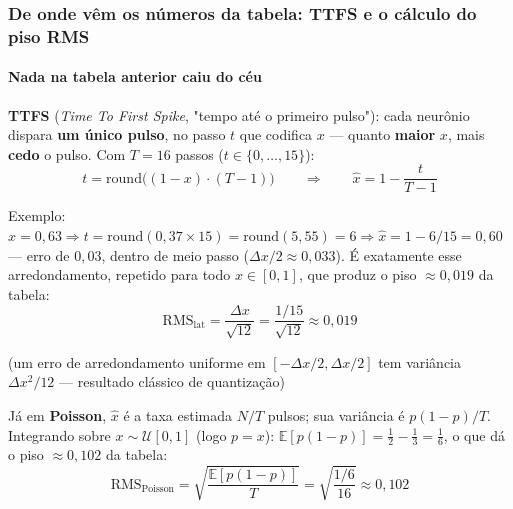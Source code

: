 \begin{frame}[shrink]
	\frametitle{De onde vêm os números da tabela: TTFS e o cálculo do piso RMS}
	\framesubtitle{Nada na tabela anterior caiu do céu}
	\small
	\par \textbf{TTFS} (\textit{Time To First Spike}, "tempo até o primeiro pulso"): cada neurônio dispara \textbf{um único pulso}, no passo $t$ que codifica $x$ --- quanto \textbf{maior} $x$, mais \textbf{cedo} o pulso. Com $T=16$ passos ($t \in \{0,\dots,15\}$):
	\begin{equation*}
		t = \mathrm{round}\big((1-x)\cdot(T-1)\big)
		\qquad\Longrightarrow\qquad
		\hat x = 1 - \frac{t}{T-1}
	\end{equation*}
	\par Exemplo: $x = 0{,}63 \Rightarrow t = \mathrm{round}(0{,}37 \times 15) = \mathrm{round}(5{,}55) = 6 \Rightarrow \hat x = 1 - 6/15 = 0{,}60$ --- erro de $0{,}03$, dentro de meio passo ($\Delta x/2 \approx 0{,}033$). É exatamente esse arredondamento, repetido para todo $x \in [0,1]$, que produz o piso $\approx 0{,}019$ da tabela:
	\begin{equation*}
		\mathrm{RMS}_{\mathrm{lat}} = \frac{\Delta x}{\sqrt{12}}
		= \frac{1/15}{\sqrt{12}} \approx 0{,}019
	\end{equation*}
	\par {\small (um erro de arredondamento uniforme em $[-\Delta x/2, \Delta x/2]$ tem variância $\Delta x^2/12$ --- resultado clássico de quantização)}
	\par Já em \textbf{Poisson}, $\hat x$ é a taxa estimada $N/T$ pulsos; sua variância é $p(1-p)/T$. Integrando sobre $x \sim \mathcal{U}[0,1]$ (logo $p=x$): $\mathbb{E}[p(1-p)] = \tfrac12 - \tfrac13 = \tfrac16$, o que dá o piso $\approx 0{,}102$ da tabela:
	\begin{equation*}
		\mathrm{RMS}_{\mathrm{Poisson}} = \sqrt{\frac{\mathbb{E}[p(1-p)]}{T}} = \sqrt{\frac{1/6}{16}} \approx 0{,}102
	\end{equation*}
\end{frame}

